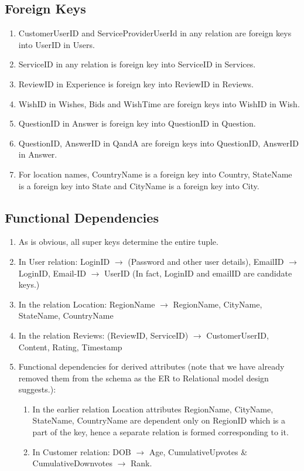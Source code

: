 \documentclass[a4paper]{article}
\begin{document}
\subsection{Foreign Keys}
\begin{enumerate}
\item CustomerUserID and ServiceProviderUserId in any relation are foreign keys into UserID in Users.
\item ServiceID in any relation is foreign key into ServiceID in Services.
\item ReviewID in Experience is foreign key into ReviewID in Reviews.
\item WishID in Wishes, Bids and WishTime are foreign keys into WishID in Wish.
\item QuestionID in Answer is foreign key into QuestionID in Question.
\item QuestionID, AnswerID in QandA are foreign keys into QuestionID, AnswerID in Answer.
\item For location names, CountryName is a foreign key into Country, StateName is a foreign key into State and CityName is a foreign key into City.
\end{enumerate}



\subsection{Functional Dependencies}
\begin{enumerate}
\item As is obvious, all super keys determine the entire tuple.
\item In User relation: LoginID $\to$ (Password and other user details), EmailID $\to$ LoginID, Email-ID $\to$ UserID (In fact, LoginID and emailID are candidate keys.)
\item In the relation Location:  RegionName $\to$ RegionName, CityName, StateName, CountryName 
\item In the relation Reviews: (ReviewID, ServiceID) $\to$  CustomerUserID, Content, Rating, Timestamp
\item Functional dependencies for derived attributes (note that we have already removed them from the schema as the ER to Relational model design suggests.):
\begin{enumerate}
\item In the earlier relation Location attributes RegionName, CityName, StateName, CountryName are dependent only on RegionID which is a part of the key, hence a separate relation is formed corresponding to it.
\item In Customer relation: DOB $\to$ Age,  CumulativeUpvotes \& CumulativeDownvotes $\to$ Rank.
\end{enumerate}
\end{enumerate}
\end{document}
